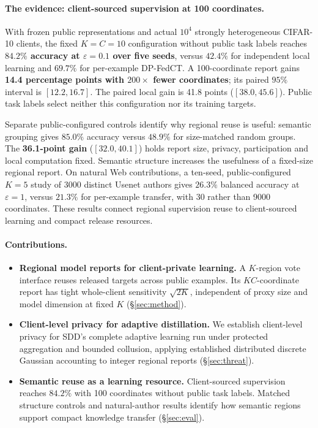 \paragraph{The evidence: client-sourced supervision at 100 coordinates.}
With frozen public representations and actual $10^4$ strongly heterogeneous
CIFAR-10 clients, the fixed $K=C=10$ configuration without public task labels
reaches \textbf{$84.2\%$ accuracy at $\varepsilon=0.1$ over five seeds},
versus $42.4\%$ for independent local learning and $69.7\%$ for per-example
DP-FedCT. A 100-coordinate report gains \textbf{14.4 percentage points with
$200\times$ fewer coordinates}; its paired $95\%$ interval is $[12.2,16.7]$.
The paired local gain is 41.8 points ($[38.0,45.6]$).
Public task labels select neither this configuration nor its training targets.

Separate public-configured controls identify why regional reuse is useful:
semantic grouping gives $85.0\%$ accuracy versus $48.9\%$ for size-matched
random groups. The \textbf{36.1-point gain} ($[32.0,40.1]$) holds report size,
privacy, participation and local computation fixed. Semantic structure
increases the usefulness of a fixed-size regional report.
On natural Web contributions, a ten-seed, public-configured $K=5$ study of
3000 distinct Usenet authors gives $26.3\%$ balanced accuracy at
$\varepsilon=1$, versus $21.3\%$ for per-example transfer, with 30 rather
than 9000 coordinates. These results connect regional supervision reuse to
client-sourced learning and compact release resources.

\paragraph{Contributions.}
\begin{itemize}[leftmargin=1.2em,itemsep=1pt,topsep=2pt]
\item \textbf{Regional model reports for client-private learning.}
A $K$-region vote interface reuses released targets across public examples.
Its $KC$-coordinate report has tight whole-client sensitivity $\sqrt{2K}$,
independent of proxy size and model dimension at fixed $K$ (\S\ref{sec:method}).
\item \textbf{Client-level privacy for adaptive distillation.}
We establish client-level privacy for SDD's complete adaptive learning run
under protected aggregation and bounded collusion, applying established
distributed discrete Gaussian accounting to integer regional reports
(\S\ref{sec:threat}).
\item \textbf{Semantic reuse as a learning resource.}
Client-sourced supervision reaches $84.2\%$ with 100 coordinates without
public task labels. Matched structure controls and natural-author results
identify how semantic regions support compact knowledge transfer
(\S\ref{sec:eval}).
\end{itemize}
